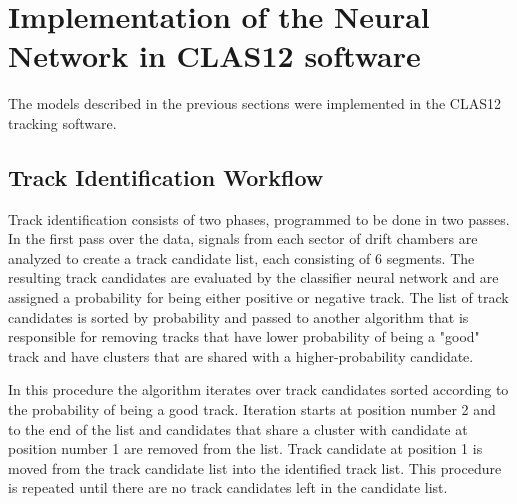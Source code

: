 \section{Implementation of the Neural Network in CLAS12 software}

The models described in the previous sections were implemented in the CLAS12 tracking software. 

\subsection{Track Identification Workflow}

 Track identification consists of two phases, programmed to be done in two passes.
In the first pass over the data, signals from each sector of drift chambers are analyzed to create a track 
candidate list, each consisting of 6 segments.
The resulting track candidates are evaluated by the classifier neural network and are assigned a probability for 
being either positive or negative track. The list of track candidates is sorted by probability and passed
to another algorithm that is responsible for removing tracks that have lower probability of being a "good" track and have
clusters that are shared with a higher-probability candidate. 

In this procedure the algorithm iterates over track candidates sorted according to the probability of being a good track.
Iteration starts at position number 2 and to the end of the list and candidates that share a cluster with 
candidate at position number 1 are removed from the list.
Track candidate at position 1 is moved from the track candidate list into the identified
track list. This procedure is repeated until there are no track candidates left in the candidate list.

